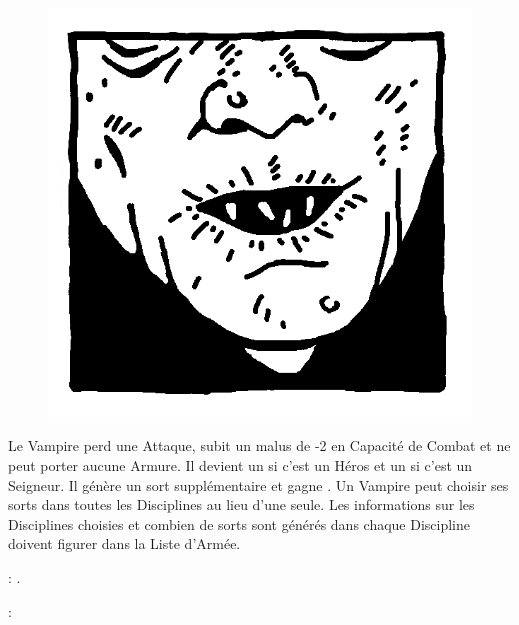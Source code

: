 \begin{figure}
\centering
\includegraphics[width=\logosize]{logos/logo_nosferatu.png}
\end{figure}
Le Vampire perd une Attaque, subit un malus de -2 en Capacité de Combat et ne peut porter aucune Armure.  Il devient un  si c'est un Héros et un  si c'est un Seigneur. Il génère un sort supplémentaire et gagne \awaken{\skeletons{}, \zombies{}}. Un Vampire \nosferatu{} peut choisir ses sorts dans toutes les Disciplines  au lieu d'une seule. Les informations sur les Disciplines choisies et combien de sorts sont générés dans chaque Discipline doivent figurer dans la Liste d'Armée.

\vspace{0.5cm}
\bloodties{} : \textbf{\wraiths{}}.

\vspace{0.5cm}
\ancientbloodpower{} : \textbf{}\dotfill{}\newline%

